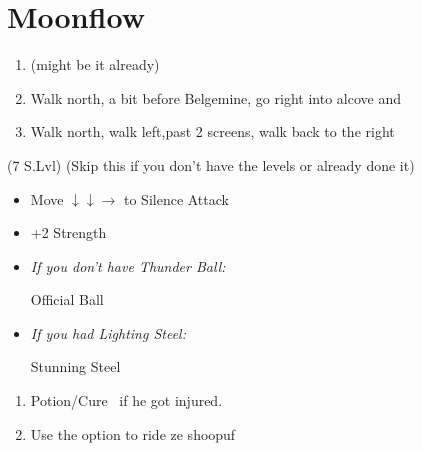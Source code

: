 \chapter{Moonflow}

\begin{enumerate}
    \item \formation{\tidus}{\kimahri}{\auron} (might be it already)
    \item Walk north, a bit before Belgemine, go right into alcove and 
    \item Walk north, walk left,past 2 screens, walk back to the right
\end{enumerate}
\begin{spheregrid}
    \begin{itemize}
        \wakkaf (7 S.Lvl) (Skip this if you don't have the levels or already done it)
        \begin{itemize}
            \item Move $\downarrow\downarrow\rightarrow$ to Silence Attack
            \item +2 Strength
        \end{itemize}
    \end{itemize}
\end{spheregrid}
\begin{equip}
    \begin{itemize}
        \item \textit{If you don't have Thunder Ball:}
        \begin{itemize}
            \wakkaf Official Ball
        \end{itemize}
        \item \textit{If you had Lighting Steel:}
        \begin{itemize}
            \tidusf Stunning Steel
        \end{itemize}
    \end{itemize}
\end{equip}
\begin{enumerate}[resume]
    \item Potion/Cure \tidus\ if he got injured.
    \item Use the  option to ride ze shoopuf
\end{enumerate}
